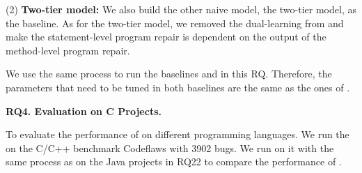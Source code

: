 (2) \textbf{Two-tier model:} We also build the other naive model, the two-tier model, as the baseline. As for the two-tier model, we removed the dual-learning from {\tool} and make the statement-level program repair is dependent on the output of the method-level program repair.

We use the same process to run the baselines and \tool in this RQ. Therefore, the parameters that need to be tuned in both baselines are the same as the ones of \tool. 

{\bf RQ4. Evaluation on C Projects.}

To evaluate the performance of \tool on different programming languages. We run the \tool on the C/C++ benchmark Codeflaws \cite{tan2017codeflaws} with 3902 bugs. We run \tool on it with the same process as on the Java projects in RQ22 to compare the performance of \tool.
